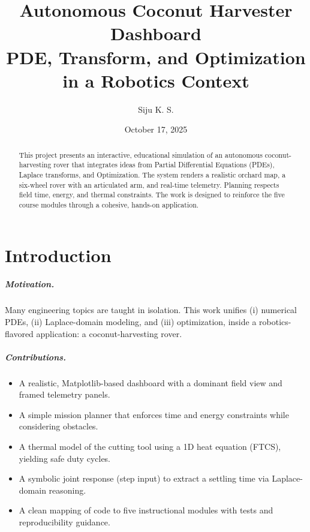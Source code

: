 \documentclass[12pt,a4paper]{report}
\title{Autonomous Coconut Harvester Dashboard\\\large PDE, Transform, and Optimization in a Robotics Context}
\author{Siju K. S.}
\date{October 17, 2025}
\begin{document}
\maketitle
{}

\begin{abstract}
This project presents an interactive, educational simulation of an autonomous coconut-harvesting rover that integrates ideas from Partial Differential Equations (PDEs), Laplace transforms, and Optimization.
The system renders a realistic orchard map, a six-wheel rover with an articulated arm, and real-time telemetry. Planning respects field time, energy, and thermal constraints. The work is designed to reinforce the five course modules through a cohesive, hands-on application.
\end{abstract}

\tableofcontents
\clearpage
{}

\chapter{Introduction}
\paragraph{Motivation.} Many engineering topics are taught in isolation. This work unifies (i) numerical PDEs, (ii) Laplace-domain modeling, and (iii) optimization, inside a robotics-flavored application: a coconut-harvesting rover.

\paragraph{Contributions.}
\begin{itemize}[noitemsep]
  \item A realistic, Matplotlib-based dashboard with a dominant field view and framed telemetry panels.
  \item A simple mission planner that enforces time and energy constraints while considering obstacles.
  \item A thermal model of the cutting tool using a 1D heat equation (FTCS), yielding safe duty cycles.
  \item A symbolic joint response (step input) to extract a settling time via Laplace-domain reasoning.
  \item A clean mapping of code to five instructional modules with tests and reproducibility guidance.
\end{itemize}
\end{document}
